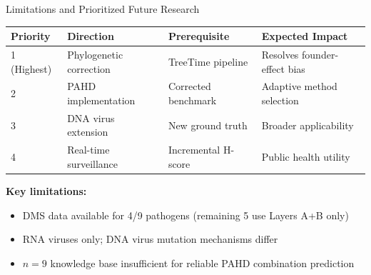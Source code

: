 \documentclass[aspectratio=169,11pt]{beamer}
\begin{document}
\begin{frame}{Limitations and Prioritized Future Research}

\begin{center}
\small
\begin{tabular}{llll}
\toprule
\textbf{Priority} & \textbf{Direction} & \textbf{Prerequisite} & \textbf{Expected Impact} \\
\midrule
\rowcolor{alertred!8}
1 (Highest) & Phylogenetic correction & TreeTime pipeline & Resolves founder-effect bias \\
\rowcolor{stage2orange!8}
2 & PAHD implementation & Corrected benchmark & Adaptive method selection \\
3 & DNA virus extension & New ground truth & Broader applicability \\
4 & Real-time surveillance & Incremental H-score & Public health utility \\
\bottomrule
\end{tabular}
\end{center}

\vspace{0.5em}
\textbf{Key limitations:}
\begin{itemize}
  \item DMS data available for 4/9 pathogens (remaining 5 use Layers A+B only)
  \item RNA viruses only; DNA virus mutation mechanisms differ
  \item $n = 9$ knowledge base insufficient for reliable PAHD combination prediction
\end{itemize}
\end{frame}
\end{document}

